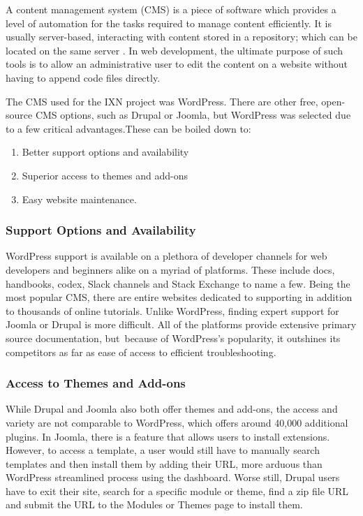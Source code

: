 \documentclass[fontsize=11pt]{extarticle}
\numberwithin{figure}{section} %
\numberwithin{table}{section}%
\providecommand{\tightlist}{%
  \setlength{\itemsep}{0pt}\setlength{\parskip}{0pt}}
\begin{document}
A content management system (CMS) is a piece of software which provides
a level of automation for the tasks required to manage content
efficiently. It is usually server-based, interacting with content stored
in a repository; which can be located on the same server \cite{p1}. In
web development, the ultimate purpose of such tools is to allow an
administrative user to edit the content on a website without having to
append code files directly.

The CMS used for the IXN project was WordPress. There are other free,
open-source CMS options, such as Drupal or Joomla, but WordPress was
selected due to a few critical advantages.These can be boiled down to:

\begin{enumerate}

\tightlist
\item
  Better support options and availability
\item
  Superior access to themes and add-ons
\item
  Easy website maintenance.
\end{enumerate}

\hypertarget{support-options-and-availability}{%
\subsubsection{Support Options and
Availability~}\label{support-options-and-availability}}

WordPress support is available on a plethora of developer channels for
web developers and beginners alike on a myriad of platforms. These
include docs, handbooks, codex, Slack channels and Stack Exchange to
name a few. Being the most popular CMS, there are entire websites
dedicated to supporting in addition to thousands of online tutorials.
Unlike WordPress, finding expert support for Joomla or Drupal is more
difficult. All of the platforms provide extensive primary source
documentation, but~because of WordPress's popularity, it outshines its
competitors as far as ease of access to efficient troubleshooting.~

\hypertarget{access-to-themes-and-add-ons}{%
\subsubsection{Access to Themes and
Add-ons~}\label{access-to-themes-and-add-ons}}

While Drupal and Joomla also both offer themes and add-ons, the access
and variety are not comparable to WordPress, which offers around 40,000
additional plugins. In Joomla, there is a feature that allows users to
install extensions. However, to access a template, a user would still
have to manually search templates and then install them by adding their
URL, more arduous than WordPress streamlined process using the
dashboard. Worse still, Drupal users have to exit their site, search for
a specific module or theme, find a zip file URL and submit the URL to
the Modules or Themes page to install them.~
\end{document}
